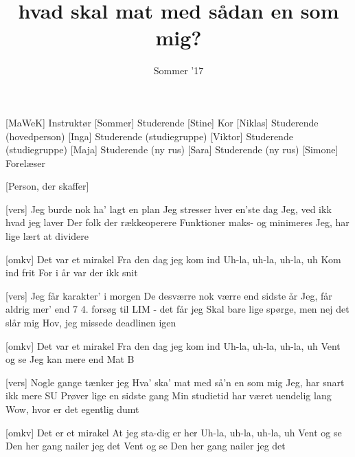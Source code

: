 \documentclass[a4paper,11pt]{article}
\title{hvad skal mat med sådan en som mig?}
\author{Sommer '17}
\begin{document}
\maketitle

\begin{roles}
[MaWeK] Instruktør
[Sommer] Studerende
[Stine] Kor
[Niklas] Studerende (hovedperson)
[Inga] Studerende (studiegruppe)
[Viktor] Studerende (studiegruppe)
[Maja] Studerende (ny rus)
[Sara] Studerende (ny rus)
[Simone] Forelæser
\end{roles}

\begin{props}
[Person, der skaffer]
\end{props}


\begin{song}

[vers]%
Jeg burde nok ha' lagt en plan
Jeg stresser hver en'ste dag
Jeg, ved ikk hvad jeg laver
Der folk der rækkeoperere
Funktioner maks- og minimeres
Jeg, har lige lært at dividere

[omkv]%
Det var et mirakel
Fra den dag jeg kom ind
Uh-la, uh-la, uh-la, uh
Kom ind frit
For i år var der ikk snit

[vers]%
Jeg får karakter' i morgen
De desværre nok værre end sidste år
Jeg, får aldrig mer' end 7
4. forsøg til LIM - det får jeg
Skal bare lige spørge, men nej det slår mig
Hov, jeg missede deadlinen igen


[omkv]%
Det var et mirakel
Fra den dag jeg kom ind
Uh-la, uh-la, uh-la, uh
Vent og se
Jeg kan mere end Mat B

[vers]%
Nogle gange tænker jeg
Hva' ska' mat med så'n en som mig
Jeg, har snart ikk mere SU
Prøver lige en sidste gang
Min studietid har været uendelig lang
Wow, hvor er det egentlig dumt

[omkv]%
Det er et mirakel
At jeg sta-dig er her
Uh-la, uh-la, uh-la, uh
Vent og se
Den her gang nailer jeg det
Vent og se
Den her gang nailer jeg det

\end{song}
\end{document}

